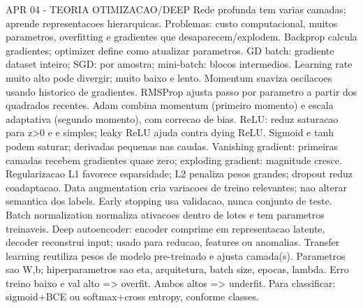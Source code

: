 APR 04 - TEORIA OTIMIZACAO/DEEP
Rede profunda tem varias camadas; aprende representacoes hierarquicas.
Problemas: custo computacional, muitos parametros, overfitting e gradientes que desaparecem/explodem.
Backprop calcula gradientes; optimizer define como atualizar parametros.
GD batch: gradiente dataset inteiro; SGD: por amostra; mini-batch: blocos intermedios.
Learning rate muito alto pode divergir; muito baixo e lento.
Momentum suaviza oscilacoes usando historico de gradientes.
RMSProp ajusta passo por parametro a partir dos quadrados recentes.
Adam combina momentum (primeiro momento) e escala adaptativa (segundo momento), com correcao de bias.
ReLU: reduz saturacao para z>0 e e simples; leaky ReLU ajuda contra dying ReLU.
Sigmoid e tanh podem saturar; derivadas pequenas nas caudas.
Vanishing gradient: primeiras camadas recebem gradientes quase zero; exploding gradient: magnitude cresce.
Regularizacao L1 favorece esparsidade; L2 penaliza pesos grandes; dropout reduz coadaptacao.
Data augmentation cria variacoes de treino relevantes; nao alterar semantica dos labels.
Early stopping usa validacao, nunca conjunto de teste.
Batch normalization normaliza ativacoes dentro de lotes e tem parametros treinaveis.
Deep autoencoder: encoder comprime em representacao latente, decoder reconstrui input; usado para reducao, features ou anomalias.
Transfer learning reutiliza pesos de modelo pre-treinado e ajusta camada(s).
Parametros sao W,b; hiperparametros sao eta, arquitetura, batch size, epocas, lambda.
Erro treino baixo e val alto => overfit. Ambos altos => underfit.
Para classificar: sigmoid+BCE ou softmax+cross entropy, conforme classes.